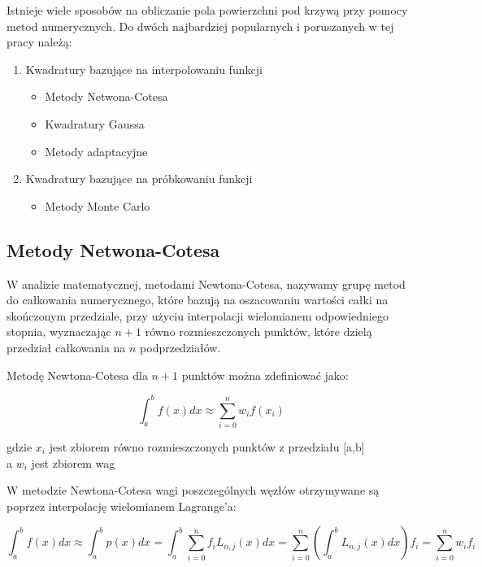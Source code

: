 \documentclass[12pt,twoside]{article}
\begin{document}
Istnieje wiele sposobów na obliczanie pola powierzchni pod krzywą przy pomocy metod numerycznych. Do dwóch najbardziej popularnych i poruszanych w tej pracy należą:

\begin{enumerate}
	\item Kwadratury bazujące na interpolowaniu funkcji
	\begin{itemize}
		\item Metody Netwona-Cotesa
		\item Kwadratury Gaussa
		\item Metody adaptacyjne
	\end{itemize}
	\item Kwadratury bazujące na próbkowaniu funkcji
	\begin{itemize}
		\item Metody Monte Carlo
	\end{itemize}
\end{enumerate}

\subsection{Metody Netwona-Cotesa}

W analizie matematycznej, metodami Newtona-Cotesa, nazywamy grupę metod do całkowania numerycznego, które bazują na oszacowaniu wartości całki na skończonym przedziale, przy użyciu interpolacji wielomianem odpowiedniego stopnia, wyznaczając $n+1$ równo rozmieszczonych punktów, które dzielą przedział całkowania na $n$ podprzedziałów.
\cite{wikipedia}

Metodę Newtona-Cotesa dla $n+1$ punktów  można zdefiniować jako:

\begin{equation}
\int_a^b f(x)dx \approx \sum_{i=0}^n w_i f(x_i)
\label{Eq:rownanie}
\end{equation}


gdzie 
$x_i$ jest zbiorem równo rozmieszczonych punktów z przedziału [a,b]\\
a $w_i$ jest zbiorem wag


W metodzie Newtona-Cotesa wagi poszczególnych węzłów otrzymywane są poprzez interpolację wielomianem Lagrange'a:

\begin{equation}
\int_a^b f(x) dx \approx \int_a^b p(x) dx = \int_a^b \sum_{i=0}^{n} f_i L_{n,j}(x) dx = \sum_{i=0}^{n}(\int_a^b L_{n,j}(x)dx)f_i = \sum_{i=0}^{n} w_i f_i
\label{Eq:rownanie}
\end{equation}
\end{document}

